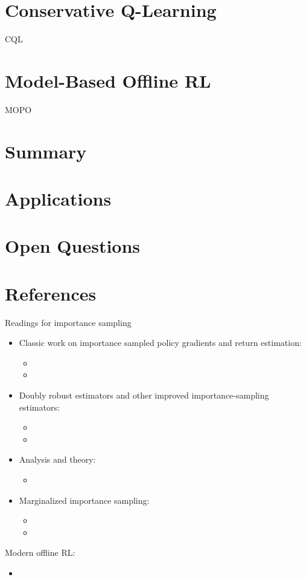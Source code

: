 \section{Conservative Q-Learning}
\ac{CQL}

\section{Model-Based Offline RL}
\ac{MOPO}

\section{Summary}
\section{Applications}
\section{Open Questions}

\section{References}
Readings for importance sampling
\begin{itemize}
	\item Classic work on importance sampled policy gradients and return estimation:
	\begin{itemize}
		\item {}
		\item {}
	\end{itemize}
	\item Doubly robust estimators and other improved importance-sampling estimators:
	\begin{itemize}
		\item {}
		\item {}
	\end{itemize}	
	\item Analysis and theory:
	\begin{itemize}
		\item {}
	\end{itemize}
	\item Marginalized importance sampling:
	\begin{itemize}
		\item {}
		\item {}
	\end{itemize}
\end{itemize}

Modern offline \ac{RL}:
\begin{itemize}
	\item {}
\end{itemize}